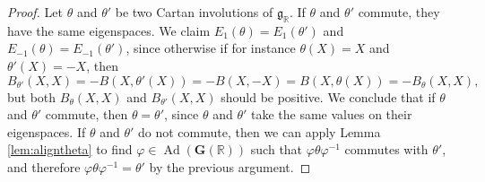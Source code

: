 \documentclass[12pt]{amsart}
\newcommand{\R}{\mathbb{R} }
\newcommand{\frakg}{\mathfrak{g}}
\newcommand{\bG}{\mathbf{G}}
\numberwithin{equation}{section}
\theoremstyle{remark} %
\begin{document}
\begin{proof}
	Let $\theta$ and $\theta'$ be two Cartan involutions of $\frakg_\R$. If $\theta$ and $\theta'$ commute, they have the same eigenspaces. We claim $E_{1}(\theta) = E_1(\theta')$ and $E_{-1}(\theta)=E_{-1}(\theta')$, since otherwise if for instance $\theta(X)=X$ and $\theta'(X)=-X$, then 
	$$
	B_{\theta'}(X,X) = -B(X,\theta'(X)) = - B(X,-X) = B(X,\theta(X)) = - B_{\theta}(X,X),
	$$
	but both $B_{\theta}(X,X)$ and $B_{\theta'}(X,X)$ should be positive. We conclude that if $\theta$ and $\theta'$ commute, then $\theta = \theta'$, since $\theta$ and $\theta'$ take the same values on their eigenspaces. If $\theta$ and $\theta'$ do not commute, then we can apply Lemma \ref{lem:aligntheta} to find $\varphi \in \operatorname{Ad}(\bG(\R))$ such that $\varphi \theta \varphi^{-1}$ commutes with $\theta'$, and therefore $\varphi \theta \varphi^{-1} = \theta'$ by the previous argument.
\end{proof}
\end{document}
